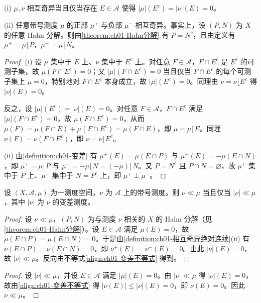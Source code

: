 \documentclass[../../main.tex]{subfiles}%
\begin{document}
\begin{remark}\label{remark:ch01-奇异绝对连续注记}
(i) $\mu,\nu$ 相互奇异当且仅当存在 $E\in\mathcal{A}$ 使得 $|\mu|(E^c)=|\nu|(E)=0$。

(ii) 任意带号测度 $\mu$ 的正部 $\mu^+$ 与负部 $\mu^-$ 相互奇异。事实上，设 $(P,N)$ 为 $X$ 的任意 Hahn 分解。则由\cref{theorem:ch01-Hahn分解} 有 $P=N^c$，且由定义有 $\mu^+=\mu\lfloor P$，$\mu^-=\mu\lfloor N$。
\end{remark}

\begin{proof}
(i) 设 $\mu$ 集中于 $E$ 上、$\nu$ 集中于 $E^c$ 上。对任意 $F\in\mathcal{A}$，$F\cap E^c$ 是 $E^c$ 的可测子集，故 $\mu(F\cap E^c)=0$；又 $|\mu|(F\cap E^c)=0$ 当且仅当 $F\cap E^c$ 的每个可测子集上 $\mu=0$，特别地对 $F\cap E^c$ 本身成立，故 $|\mu|(E^c)=0$。同理由 $\nu=\nu\lfloor E^c$ 得 $|\nu|(E)=0$。

反之，设 $|\mu|(E^c)=|\nu|(E)=0$。对任意 $F\in\mathcal{A}$，$F\cap E^c$ 满足 $|\mu|(F\cap E^c)=0$，故 $\mu(F\cap E^c)=0$，从而 $\mu(F)=\mu(F\cap E)+\mu(F\cap E^c)=\mu(F\cap E)$，即 $\mu=\mu\lfloor E$。同理 $\nu(F)=\nu(F\cap E^c)$，即 $\nu=\nu\lfloor E^c$。

(ii) 由\cref{definition:ch01-变差} 有 $\mu^+(E)=\mu(E\cap P)$ 与 $\mu^-(E)=-\mu(E\cap N)$，即 $\mu^+=\mu\lfloor P$ 与 $\mu^-=-\mu\lfloor N=(-\mu)\lfloor N$。又 $P=N^c$ 且 $P\cap N=\varnothing$，故 $\mu^+$ 集中于 $P$ 上、$\mu^-$ 集中于 $N=P^c$ 上，即 $\mu^+\perp\mu^-$。
\end{proof}

\begin{lemma}\label{lemma:ch01-绝对连续等价}
设 $(X,\mathcal{A},\mu)$ 为一测度空间，$\nu$ 为 $\mathcal{A}$ 上的带号测度。则 $\nu\ll\mu$ 当且仅当 $|\nu|\ll\mu$，其中 $|\nu|$ 为 $\nu$ 的变差测度。
\end{lemma}

\begin{proof}
设 $\nu\ll\mu$，$(P,N)$ 为与测度 $\nu$ 相关的 $X$ 的 Hahn 分解（见\cref{theorem:ch01-Hahn分解}）。设 $E\in\mathcal{A}$ 满足 $\mu(E)=0$，故 $\mu(E\cap P)=\mu(E\cap N)=0$。于是由\cref{definition:ch01-相互奇异绝对连续}(ii) 有 $\nu(E\cap P)=\nu(E\cap N)=0$，即 $\nu^+(E)=\nu^-(E)=0$。由此 $|\nu|(E)=0$，故 $|\nu|\ll\mu$。反向由不等式\eqref{align:ch01-变差不等式} 得到。
\end{proof}

\begin{proof}
设 $|\nu|\ll\mu$，并设 $E\in\mathcal{A}$ 满足 $|\mu|(E)=0$。由 $|\nu|\ll\mu$ 得 $|\nu|(E)=0$，故由\eqref{align:ch01-变差不等式} 得 $|\nu(E)|\leqslant|\nu|(E)=0$，即 $\nu(E)=0$。因此 $\nu\ll\mu$。
\end{proof}
\end{document}
